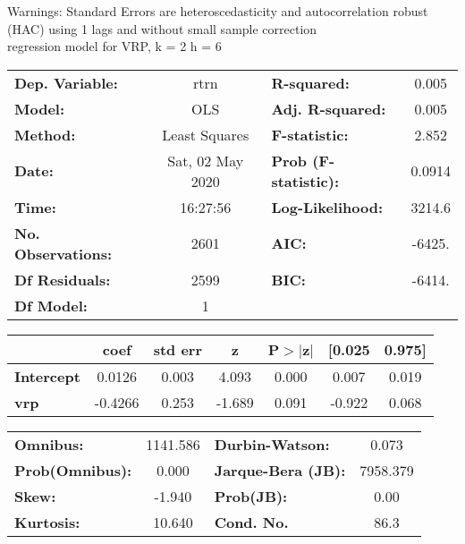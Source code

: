 Warnings: \newline
 [1] Standard Errors are heteroscedasticity and autocorrelation robust (HAC) using 1 lags and without small sample correction\\ 

regression model for VRP, k = 2 h = 6\begin{center}
\begin{tabular}{lclc}
\toprule
\textbf{Dep. Variable:}    &       rtrn       & \textbf{  R-squared:         } &     0.005   \\
\textbf{Model:}            &       OLS        & \textbf{  Adj. R-squared:    } &     0.005   \\
\textbf{Method:}           &  Least Squares   & \textbf{  F-statistic:       } &     2.852   \\
\textbf{Date:}             & Sat, 02 May 2020 & \textbf{  Prob (F-statistic):} &   0.0914    \\
\textbf{Time:}             &     16:27:56     & \textbf{  Log-Likelihood:    } &    3214.6   \\
\textbf{No. Observations:} &        2601      & \textbf{  AIC:               } &    -6425.   \\
\textbf{Df Residuals:}     &        2599      & \textbf{  BIC:               } &    -6414.   \\
\textbf{Df Model:}         &           1      & \textbf{                     } &             \\
\bottomrule
\end{tabular}
\begin{tabular}{lcccccc}
                   & \textbf{coef} & \textbf{std err} & \textbf{z} & \textbf{P$> |$z$|$} & \textbf{[0.025} & \textbf{0.975]}  \\
\midrule
\textbf{Intercept} &       0.0126  &        0.003     &     4.093  &         0.000        &        0.007    &        0.019     \\
\textbf{vrp}       &      -0.4266  &        0.253     &    -1.689  &         0.091        &       -0.922    &        0.068     \\
\bottomrule
\end{tabular}
\begin{tabular}{lclc}
\textbf{Omnibus:}       & 1141.586 & \textbf{  Durbin-Watson:     } &    0.073  \\
\textbf{Prob(Omnibus):} &   0.000  & \textbf{  Jarque-Bera (JB):  } & 7958.379  \\
\textbf{Skew:}          &  -1.940  & \textbf{  Prob(JB):          } &     0.00  \\
\textbf{Kurtosis:}      &  10.640  & \textbf{  Cond. No.          } &     86.3  \\
\bottomrule
\end{tabular}
\end{center}

